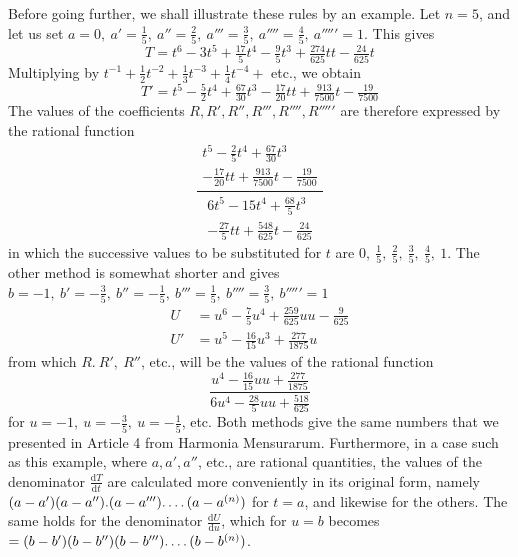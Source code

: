 Before going further, we shall illustrate these rules by an example. Let $n=5$, and let us set $a=0,\ a'=\frac15,\ a''=\frac25,\ a'''=\frac35,\ a''''=\frac45,\ a'''''=1$. This gives
\[
T=t^6-3t^5+\tfrac{17}{5}t^4-\tfrac95t^3+\tfrac{274}{625}tt-\tfrac{24}{625}t
\]
Multiplying by $t^{-1}+\frac12t^{-2}+\frac13t^{-3}+\frac14t^{-4}+$ etc., we obtain
\[
T'=t^5-\tfrac52t^4+\tfrac{67}{30}t^3-\tfrac{17}{20}tt+\tfrac{913}{7500}t-\tfrac{19}{7500}
\]
The values of the coefficients $R, R', R'', R''', R'''', R'''''$ are therefore expressed by the rational function
\[
\frac{\begin{gathered}t^5-\frac25t^4+\frac{67}{30}t^3\\-\frac{17}{20}tt+\frac{913}{7500}t-\frac{19}{7500}\end{gathered}}
{\begin{gathered}6t^5-15t^4+\frac{68}{5}t^3\\-\frac{27}{5}tt+\frac{548}{625}t-\frac{24}{625}\end{gathered}}
\]
in which the successive values to be substituted for $t$ are $0,\ \frac15,\ \frac25,\ \frac35,\ \frac45,\ 1$. The other method is somewhat shorter and gives $b=-1,\ b'=-\frac35,\ b''=-\frac15,\ b'''=\frac15,\ b''''=\frac35,\ b'''''=1$
\[
\begin{aligned}
U&=u^6-\tfrac75u^4+\tfrac{259}{625}uu-\tfrac9{625}\\
U'&=u^5-\tfrac{16}{15}u^3+\tfrac{277}{1875}u
\end{aligned}
\]
from which $R.\ R',\ R''$, etc., will be the values of the rational function
\[
\frac{u^4-\frac{16}{15}uu+\frac{277}{1875}}
{6u^4-\frac{28}{5}uu+\frac{518}{625}}
\]
for $u=-1,\ u=-\frac35,\ u=-\frac15$, etc. Both methods give the same numbers that we presented in Article 4 from Harmonia Mensurarum. Furthermore, in a case such as this example, where $a, a', a''$, etc., are rational quantities, the values of the denominator $\frac{\mathrm{d}T}{\mathrm{d}t}$ are calculated more conveniently in its original form, namely $(a-a')(a-a'').(a-a''')\ldotp\ldotp\ldotp\ldotp(a-a^{(n)})$ for $t=a$, and likewise for the others. The same holds for the denominator $\frac{\mathrm{d}U}{\mathrm{d}u}$, which for $u=b$ becomes $=(b-b')(b-b'')(b-b''')\ldotp\ldotp\ldotp\ldotp(b-b^{(n)})$.
